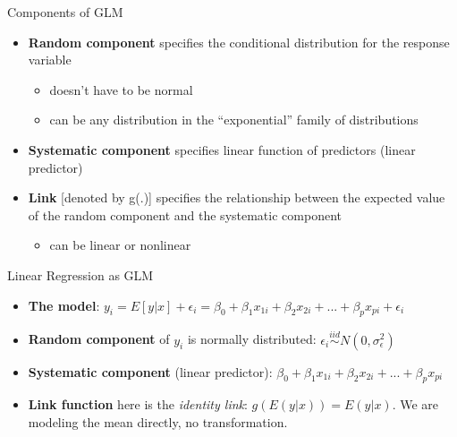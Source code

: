 \documentclass[
  ignorenonframetext,
]{beamer}
\providecommand{\tightlist}{%
  \setlength{\itemsep}{0pt}\setlength{\parskip}{0pt}}
\begin{document}
\begin{frame}{Components of GLM}
\protect\hypertarget{components-of-glm}{}

\begin{itemize}
\tightlist
\item
  \textbf{Random component} specifies the conditional distribution for
  the response variable

  \begin{itemize}
  \tightlist
  \item
    doesn't have to be normal
  \item
    can be any distribution in the ``exponential'' family of
    distributions
  \end{itemize}
\item
  \textbf{Systematic component} specifies linear function of predictors
  (linear predictor)
\item
  \textbf{Link} {[}denoted by g(.){]} specifies the relationship between
  the expected value of the random component and the systematic
  component

  \begin{itemize}
  \tightlist
  \item
    can be linear or nonlinear
  \end{itemize}
\end{itemize}

\end{frame}

\begin{frame}{Linear Regression as GLM}
\protect\hypertarget{linear-regression-as-glm}{}

\begin{itemize}
\item
  \textbf{The model}:
  \(y_i = E[y|x] + \epsilon_i = \beta_0 + \beta_1 x_{1i} + \beta_2 x_{2i} + ... + \beta_p x_{pi} + \epsilon_i\)
\item
  \textbf{Random component} of \(y_i\) is normally distributed:
  \(\epsilon_i \stackrel{iid}{\sim} N(0, \sigma_\epsilon^2)\)
\item
  \textbf{Systematic component} (linear predictor):
  \(\beta_0 + \beta_1 x_{1i} + \beta_2 x_{2i} + ... + \beta_p x_{pi}\)
\item
  \textbf{Link function} here is the \emph{identity link}:
  \(g(E(y | x)) = E(y | x)\). We are modeling the mean directly, no
  transformation.
\end{itemize}

\end{frame}
\end{document}
